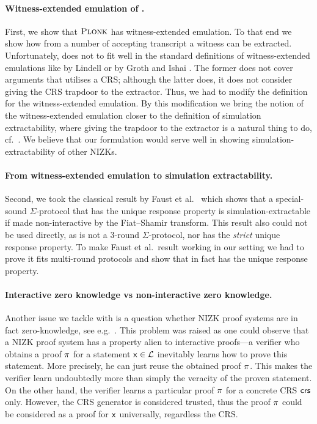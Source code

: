 \documentclass[runningheads,11pt]{llncs}
\theoremstyle{definition}
\begin{document}
\paragraph{Witness-extended emulation of \plonk{}.}
First, we show that $\textsc{Plonk}$ has witness-extended emulation. To that end we show how from a number of accepting transcript a witness can be extracted. Unfortunately, \plonk{} does not to fit well in the standard definitions of witness-extended emulations like by Lindell \cite{JC:Lindell03} or by Groth and Ishai \cite{EC:GroIsh08}. The former does not cover arguments that utilises a CRS; although the latter does, it does not consider giving the CRS trapdoor to the extractor. Thus, we had to modify the definition for the witness-extended emulation.
By this modification we bring the notion of the witness-extended emulation closer to the definition of simulation extractability, where giving the trapdoor to the extractor is a natural thing to do, cf.~\cite{AC:Groth06,AC:DHLW10,PKC:ADKNO13,DCC:DerSla19}.
We believe that our formulation would serve well in showing simulation-extractability of other NIZKs.

\paragraph{From witness-extended emulation to simulation extractability.}
Second, we took the classical result by Faust et al.~\cite{INDOCRYPT:FKMV12} which shows that a special-sound $\Sigma$-protocol that has the unique response property is simulation-extractable if made non-interactive by the Fiat--Shamir transform. This result also could not be used directly, as \plonk{} is not a $3$-round $\Sigma$-protocol, nor has the \emph{strict} unique response property.
To make Faust et al.~result working in our setting we had to prove it fits multi-round protocols and show that \plonk{} in fact has the unique response property.

\paragraph{Interactive zero knowledge vs non-interactive zero knowledge.}
Another issue we tackle with is a question whether NIZK proof systems are in fact zero-knowledge, see e.g.~\cite{C:Pass03}. This problem was raised as one could observe that a NIZK proof system has a property alien to interactive proofs---a verifier who obtains a proof $\pi$ for a statement $\mathsf{x} \in \mathcal{L}$ inevitably learns how to prove this statement. More precisely, he can just reuse the obtained proof $\pi$. This makes the verifier learn undoubtedly more than simply the veracity of the proven statement. On the other hand, the verifier learns a particular proof $\pi$ for a concrete CRS $\mathsf{crs}$ only. However, the CRS generator is considered trusted, thus the proof $\pi$ could be considered as a proof for $\mathsf{x}$ universally, regardless the CRS.
\end{document}
